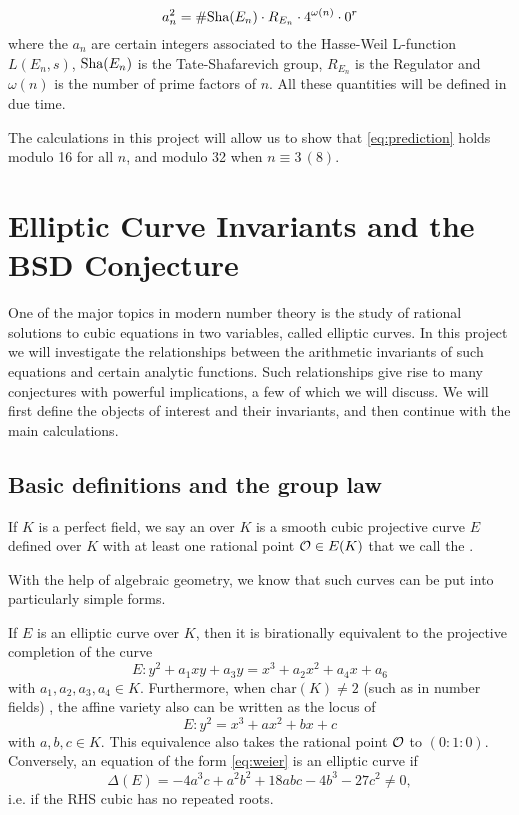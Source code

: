 \documentclass[12pt, a4paper]{report}
\begin{document}
\begin{equation} \label{eq:prediction}
  a_n^2 = \# \text{\normalfont Sha}(E_n) \cdot R_{E_n} \cdot 4^{\omega(n)} \cdot 0^r
\end{equation}
where the $a_n$ are certain integers associated to the Hasse-Weil L-function
$L(E_n,s)$, $\text{\normalfont Sha}(E_n)$ is the Tate-Shafarevich group,
$R_{E_n}$ is the Regulator and $\omega(n)$ is the number of prime factors of
$n$. All these quantities will be defined in due time. 

The calculations in this project will allow us to show that
\autoref{eq:prediction} holds modulo 16 for all $n$, and modulo 32 when $n
\equiv 3 \, (8).$

\chapter{Elliptic Curve Invariants and the BSD Conjecture}

One of the major topics in modern number theory is the study of rational
solutions to cubic equations in two variables, called elliptic curves.
In this project we will
investigate the relationships between the arithmetic invariants of such
equations and certain analytic functions. Such relationships give rise to
many conjectures with powerful implications, a few of which we will discuss.
We will first define the objects of interest and their invariants, and then
continue with the main calculations.

\section{Basic definitions and the group law}

\begin{defn}
  If $K$ is a perfect field,
  we say an  over $K$ is a smooth cubic projective
  curve $E$ defined over $K$ with at least one rational point ${\mathcal O} \in E(K)$
  that we call the .
\end{defn}
With the help of algebraic geometry, we know that such curves can be put
into particularly simple forms.

\begin{prop}
  If $E$ is an elliptic curve over $K$, then it is birationally equivalent
  to the projective completion of the curve
  \begin{equation} \label{eq:weier2}
    E: y^2 + a_1xy + a_3y = x^3 + a_2x^2 + a_4x + a_6
  \end{equation}
  with $a_1, a_2, a_3, a_4 \in K.$
  Furthermore, when $\text{char}(K) \neq 2$ (such as in number fields)
  , the affine variety also can be written as the locus of
  \begin{equation} \label{eq:weier}
    E: y^2 = x^3 + ax^2 + bx + c
  \end{equation}
  with $a, b, c\in K$. This equivalence also takes the rational point ${\mathcal O}$ to
  $(0 : 1 : 0)$.
  Conversely, an equation of the form \ref{eq:weier} is an elliptic curve if
  \[\Delta(E) = -4a^3c + a^2b^2 + 18abc - 4b^3 - 27c^2 \neq 0,\]
  i.e. if the RHS cubic has no repeated roots.
\end{prop}
\end{document}
